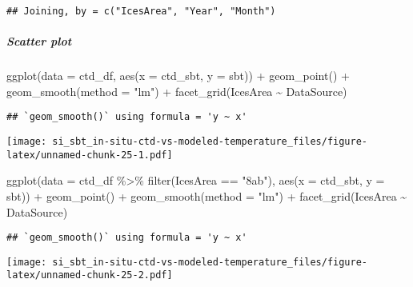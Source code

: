 \documentclass[
]{article}
\newenvironment{Shaded}{\begin{snugshade}}{\end{snugshade}}
\newcommand{\AttributeTok}[1]{\textcolor[rgb]{0.77,0.63,0.00}{#1}}
\newcommand{\FunctionTok}[1]{\textcolor[rgb]{0.00,0.00,0.00}{#1}}
\newcommand{\NormalTok}[1]{#1}
\newcommand{\SpecialCharTok}[1]{\textcolor[rgb]{0.00,0.00,0.00}{#1}}
\newcommand{\StringTok}[1]{\textcolor[rgb]{0.31,0.60,0.02}{#1}}
\begin{document}
\begin{verbatim}
## Joining, by = c("IcesArea", "Year", "Month")
\end{verbatim}

\hypertarget{scatter-plot}{%
\subparagraph{Scatter plot}\label{scatter-plot}}

\begin{Shaded}
\begin{Highlighting}[]
\FunctionTok{ggplot}\NormalTok{(}\AttributeTok{data =}\NormalTok{ ctd\_df, }\FunctionTok{aes}\NormalTok{(}\AttributeTok{x =}\NormalTok{ ctd\_sbt, }\AttributeTok{y =}\NormalTok{ sbt)) }\SpecialCharTok{+} \FunctionTok{geom\_point}\NormalTok{() }\SpecialCharTok{+} \FunctionTok{geom\_smooth}\NormalTok{(}\AttributeTok{method =} \StringTok{"lm"}\NormalTok{) }\SpecialCharTok{+} \FunctionTok{facet\_grid}\NormalTok{(IcesArea }\SpecialCharTok{\textasciitilde{}}\NormalTok{ DataSource)}
\end{Highlighting}
\end{Shaded}

\begin{verbatim}
## `geom_smooth()` using formula = 'y ~ x'
\end{verbatim}

\texttt{[image: si\_sbt\_in-situ-ctd-vs-modeled-temperature\_files/figure-latex/unnamed-chunk-25-1.pdf]}

\begin{Shaded}
\begin{Highlighting}[]
\FunctionTok{ggplot}\NormalTok{(}\AttributeTok{data =}\NormalTok{ ctd\_df }\SpecialCharTok{\%\textgreater{}\%} \FunctionTok{filter}\NormalTok{(IcesArea }\SpecialCharTok{==} \StringTok{"8ab"}\NormalTok{), }\FunctionTok{aes}\NormalTok{(}\AttributeTok{x =}\NormalTok{ ctd\_sbt, }\AttributeTok{y =}\NormalTok{ sbt)) }\SpecialCharTok{+} \FunctionTok{geom\_point}\NormalTok{() }\SpecialCharTok{+} \FunctionTok{geom\_smooth}\NormalTok{(}\AttributeTok{method =} \StringTok{"lm"}\NormalTok{) }\SpecialCharTok{+} \FunctionTok{facet\_grid}\NormalTok{(IcesArea }\SpecialCharTok{\textasciitilde{}}\NormalTok{ DataSource) }
\end{Highlighting}
\end{Shaded}

\begin{verbatim}
## `geom_smooth()` using formula = 'y ~ x'
\end{verbatim}

\texttt{[image: si\_sbt\_in-situ-ctd-vs-modeled-temperature\_files/figure-latex/unnamed-chunk-25-2.pdf]}
\end{document}
